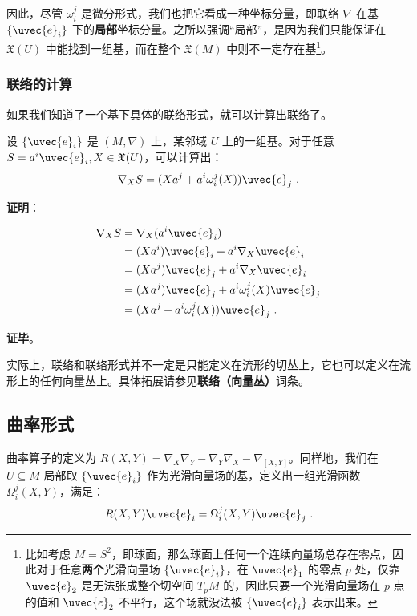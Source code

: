 因此，尽管 $\omega_i^j$ 是微分形式，我们也把它看成一种坐标分量，即联络 $\nabla$ 在基 $\{\uvec{e}_i\}$ 下的\textbf{局部}坐标分量。之所以强调“局部”，是因为我们只能保证在 $\mathfrak{X}(U)$ 中能找到一组基，而在整个 $\mathfrak{X}(M)$ 中则不一定存在基\footnote{比如考虑 $M=S^2$，即球面，那么球面上任何一个连续向量场总存在零点，因此对于任意\textbf{两个}光滑向量场 $\{\uvec{e}_i\}$，在 $\uvec{e}_1$ 的零点 $p$ 处，仅靠 $\uvec{e}_2$ 是无法张成整个切空间 $T_pM$ 的，因此只要一个光滑向量场在 $p$ 点的值和 $\uvec{e}_2$ 不平行，这个场就没法被 $\{\uvec{e}_i\}$ 表示出来。}。

\subsubsection{联络的计算}

如果我们知道了一个基下具体的联络形式，就可以计算出联络了。

\begin{theorem}{}
设 $\{\uvec{e}_i\}$ 是 $(M, \nabla)$ 上，某邻域 $U$ 上的一组基。对于任意 $S=a^i\uvec{e}_i, X\in\mathfrak{X}(U)$，可以计算出：
\begin{equation}
\nabla_XS=(Xa^j+a^i\omega^j_i(X))\uvec{e}_j~.
\end{equation}
\end{theorem}

\textbf{证明}：

\begin{equation}
\begin{aligned}
\nabla_XS&=\nabla_X(a^i\uvec{e}_i)\\
&=(Xa^i)\uvec{e}_i+a^i\nabla_X\uvec{e}_i\\
&=(Xa^j)\uvec{e}_j+a^i\nabla_X\uvec{e}_i\\
&=(Xa^j)\uvec{e}_j+a^i\omega^j_i(X)\uvec{e}_j\\
&=(Xa^j+a^i\omega^j_i(X))\uvec{e}_j~.
\end{aligned}
\end{equation}

\textbf{证毕}。

实际上，联络和联络形式并不一定是只能定义在流形的切丛上，它也可以定义在流形上的任何向量丛上。具体拓展请参见\textbf{联络（向量丛）}词条。

\subsection{曲率形式}

曲率算子的定义为 $R(X, Y)=\nabla_X\nabla_Y-\nabla_Y\nabla_X-\nabla_{[X, Y]}$。同样地，我们在 $U\subseteq M$ 局部取 $\{\uvec{e}_i\}$ 作为光滑向量场的基，定义出一组光滑函数 $\Omega^j_i(X, Y)$，满足：
\begin{equation}
R(X, Y)\uvec{e}_i=\Omega^j_i(X, Y)\uvec{e}_j~.
\end{equation}

